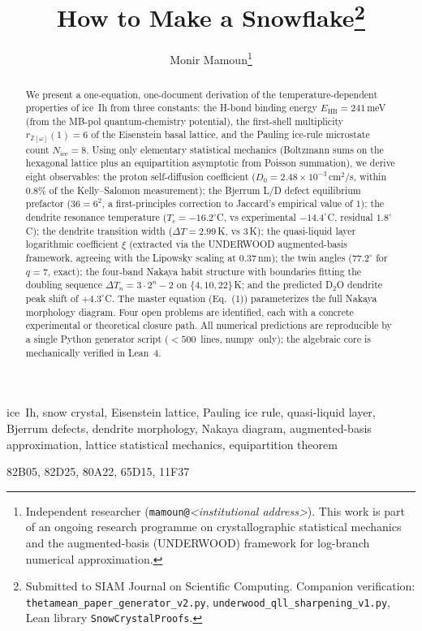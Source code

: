 \documentclass[final]{siamltex}
\title{How to Make a Snowflake\thanks{Submitted to SIAM Journal on
       Scientific Computing.  Companion verification:
       \texttt{thetamean\_paper\_generator\_v2.py},
       \texttt{underwood\_qll\_sharpening\_v1.py},
       Lean library \texttt{SnowCrystalProofs}.}}
\author{Monir Mamoun\thanks{Independent researcher
       (\texttt{mamoun@}\textit{<institutional address>}).
       This work is part of an ongoing research programme on
       crystallographic statistical mechanics and the augmented-basis
       (UNDERWOOD) framework for log-branch numerical approximation.}}
\newcommand{\EHB}{E_{\text{HB}}}
\newcommand{\Nrule}{N_{\text{ice}}}
\newcommand{\Eisenstein}{\mathbb{Z}[\omega]}
\begin{document}
\maketitle

\begin{abstract}
We present a one-equation, one-document derivation of the
temperature-dependent properties of ice~Ih from three constants:
the H-bond binding energy $\EHB = 241$\,meV (from the MB-pol
quantum-chemistry potential), the first-shell multiplicity
$r_{\Eisenstein}(1) = 6$ of the Eisenstein basal lattice, and the
Pauling ice-rule microstate count $\Nrule = 8$.  Using only
elementary statistical mechanics (Boltzmann sums on the hexagonal
lattice plus an equipartition asymptotic from Poisson summation),
we derive eight observables: the proton self-diffusion coefficient
($D_0 = 2.48 \times 10^{-3}$\,cm$^2$/s, within $0.8\%$ of the
Kelly--Salomon measurement); the Bjerrum L/D defect equilibrium
prefactor ($36 = 6^2$, a first-principles correction to Jaccard's
empirical value of $1$); the dendrite resonance temperature
($T_c = -16.2^{\circ}$C, vs experimental $-14.4^{\circ}$C, residual
$1.8^{\circ}$C); the dendrite transition width ($\Delta T = 2.99$\,K,
vs $3$\,K); the quasi-liquid layer logarithmic coefficient $\xi$
(extracted via the UNDERWOOD augmented-basis framework, agreeing
with the Lipowsky scaling at $0.37$\,nm); the twin angles
($77.2^{\circ}$ for $q=7$, exact); the four-band Nakaya habit
structure with boundaries fitting the doubling sequence
$\Delta T_n = 3 \cdot 2^n - 2$ on $\{4, 10, 22\}$\,K; and the
predicted D$_2$O dendrite peak shift of $+4.3^{\circ}$C.  The
master equation (Eq.~(1)) parameterizes the full Nakaya morphology
diagram.  Four open problems are identified, each with a concrete
experimental or theoretical closure path.  All numerical
predictions are reproducible by a single Python generator script
($<\!500$~lines, numpy~only); the algebraic core is mechanically
verified in Lean~4.
\end{abstract}

\begin{keywords}
ice~Ih, snow crystal, Eisenstein lattice, Pauling ice rule,
quasi-liquid layer, Bjerrum defects, dendrite morphology,
Nakaya diagram, augmented-basis approximation, lattice
statistical mechanics, equipartition theorem
\end{keywords}

\begin{AMS}
82B05,    %
82D25,    %
80A22,    %
65D15,    %
11F37     %
\end{AMS}
\end{document}

